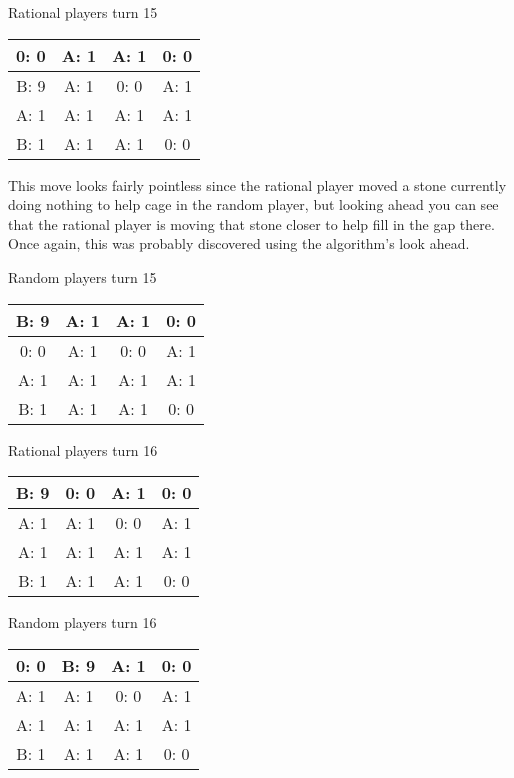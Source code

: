 \documentclass[12pt]{article}
\begin{document}
Rational players turn 15
\begin{center}
\begin{tabular}{|c|c|c|c|}
\hline
0: 0  & A: 1  & A: 1  & 0: 0  \\ \hline
B: 9  & A: 1  & 0: 0  & A: 1  \\ \hline
A: 1  & A: 1  & A: 1  & A: 1  \\ \hline
B: 1  & A: 1  & A: 1  & 0: 0  \\ \hline
\end{tabular}
\end{center}
This move looks fairly pointless since the rational player moved a stone currently doing nothing to help cage in the random player, but looking ahead you can see that the rational player is moving that stone closer to help fill in the gap there. Once again, this was probably discovered using the algorithm's look ahead.

Random players turn 15
\begin{center}
\begin{tabular}{|c|c|c|c|}
\hline
B: 9  & A: 1  & A: 1  & 0: 0  \\ \hline
0: 0  & A: 1  & 0: 0  & A: 1  \\ \hline
A: 1  & A: 1  & A: 1  & A: 1  \\ \hline
B: 1  & A: 1  & A: 1  & 0: 0  \\ \hline
\end{tabular}
\end{center}

Rational players turn 16
\begin{center}
\begin{tabular}{|c|c|c|c|}
\hline
B: 9  & 0: 0  & A: 1  & 0: 0  \\ \hline
A: 1  & A: 1  & 0: 0  & A: 1  \\ \hline
A: 1  & A: 1  & A: 1  & A: 1  \\ \hline
B: 1  & A: 1  & A: 1  & 0: 0  \\ \hline
\end{tabular}
\end{center}
Random players turn 16
\begin{center}
\begin{tabular}{|c|c|c|c|}
\hline
0: 0  & B: 9  & A: 1  & 0: 0  \\ \hline
A: 1  & A: 1  & 0: 0  & A: 1  \\ \hline
A: 1  & A: 1  & A: 1  & A: 1  \\ \hline
B: 1  & A: 1  & A: 1  & 0: 0  \\ \hline
\end{tabular}
\end{center}
\end{document}
